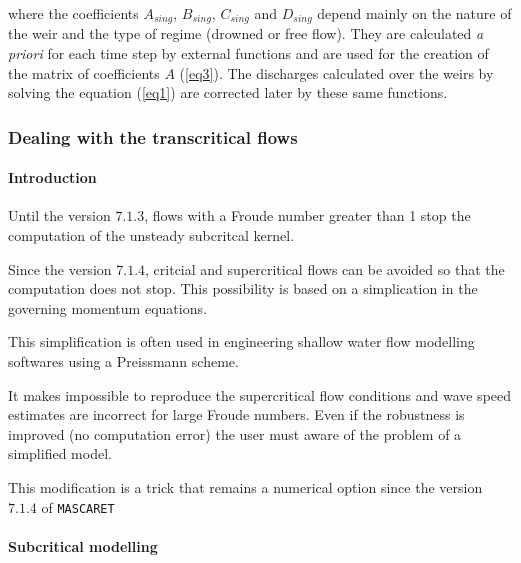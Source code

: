\vspace{0.5cm}

where the coefficients $A_{sing}$, $B_{sing}$, $C_{sing}$ and $D_{sing}$ depend mainly on the nature of the weir and the type of regime (drowned or free flow). They are calculated \textit{a priori} for each time step by external functions and are used for the creation of the matrix of coefficients $A$ (\ref{eq3}). The discharges calculated over the weirs by solving the equation (\ref{eq1}) are corrected later by these same functions.

\subsubsection{Dealing with the transcritical flows}

\paragraph{Introduction\\}

\hspace*{1cm}

Until the version $7.1.3$, flows with a Froude number greater than 1 stop the computation of the unsteady subcritcal kernel.

\vspace{0.5cm}

Since the version $7.1.4$, critcial and supercritical flows can be avoided so that the computation does not stop.
This possibility is based on a simplication in the governing momentum equations.

\vspace{0.5cm}

This simplification is often used in engineering shallow water flow modelling softwares using a Preissmann scheme.

\vspace{0.5cm}

It makes impossible to reproduce the supercritical flow conditions and wave speed estimates are incorrect for large Froude numbers. Even if the robustness is improved (no computation error) the user must aware of the problem of a simplified model.

\vspace{0.5cm}

This modification is a trick that remains a numerical option since the version $7.1.4$ of \texttt{MASCARET}

\paragraph{Subcritical modelling\\}

